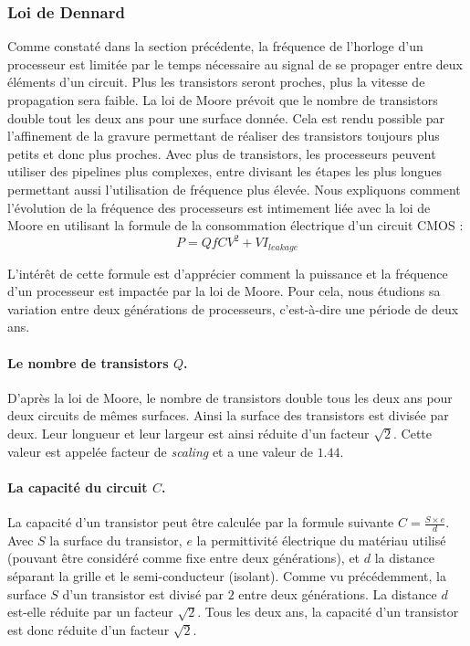 \subsubsection{Loi de Dennard}
Comme constaté dans la section précédente, la fréquence de l'horloge d'un processeur est limitée par le temps nécessaire au signal de se propager entre deux éléments d'un circuit. Plus les transistors seront proches, plus la vitesse de propagation sera faible. La loi de Moore prévoit que le nombre de transistors double tout les deux ans pour une surface donnée. Cela est rendu possible par l'affinement de la gravure permettant de réaliser des transistors toujours plus petits et donc plus proches. Avec plus de transistors, les processeurs peuvent utiliser des pipelines plus complexes, entre divisant les étapes les plus longues permettant aussi l'utilisation de fréquence plus élevée. Nous expliquons comment l'évolution de la fréquence des processeurs est intimement liée avec la loi de Moore en utilisant la formule de la consommation électrique d'un circuit CMOS \cite{martin2014post}:
\begin{equation}
P = QfCV^{2} +  VI_{leakage}
\label{eq:power}
\end{equation}


L'intérêt de cette formule est d'apprécier comment la puissance et la fréquence d'un processeur est impactée par la loi de Moore. Pour cela, nous étudions sa variation entre deux générations de processeurs, c'est-à-dire une période de deux ans.


\paragraph{Le nombre de transistors $Q$.} D'après la loi de Moore, le nombre de transistors double tous les deux ans pour deux circuits de mêmes surfaces. Ainsi la surface des transistors est divisée par deux. Leur longueur et  leur largeur est ainsi réduite d'un facteur $\sqrt{2}$. Cette valeur est appelée facteur de \textit{scaling} et a une valeur de $1.44$.

\paragraph{La capacité du circuit $C$.} La capacité d'un transistor peut être calculée par la formule suivante $C = \frac{S \times e}{d}$. Avec $S$ la surface du transistor, $e$ la permittivité électrique du matériau utilisé (pouvant être considéré comme fixe entre deux générations), et $d$ la distance séparant la grille et le semi-conducteur (isolant). Comme vu précédemment, la surface $S$ d'un transistor est divisé par $2$ entre deux générations. La distance $d$ est-elle réduite par un facteur $\sqrt{2}$. Tous les deux ans, la capacité d'un transistor est donc réduite d’un facteur $\sqrt{2}$. 

